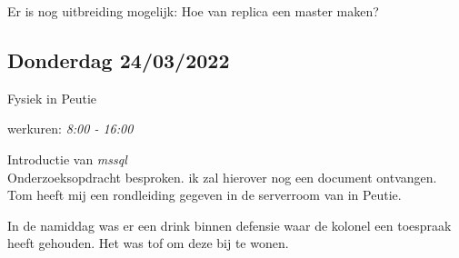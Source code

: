 \documentclass[
]{article}
\begin{document}
Er is nog uitbreiding mogelijk: Hoe van replica een master maken?

\hypertarget{donderdag-24032022}{%
\subsection{Donderdag 24/03/2022}\label{donderdag-24032022}}

Fysiek in Peutie

werkuren: \emph{8:00 - 16:00}

Introductie van \emph{mssql}\\
Onderzoeksopdracht besproken. ik zal hierover nog een document
ontvangen.\\
Tom heeft mij een rondleiding gegeven in de serverroom van in Peutie.

In de namiddag was er een drink binnen defensie waar de kolonel een
toespraak heeft gehouden. Het was tof om deze bij te wonen.
\end{document}
